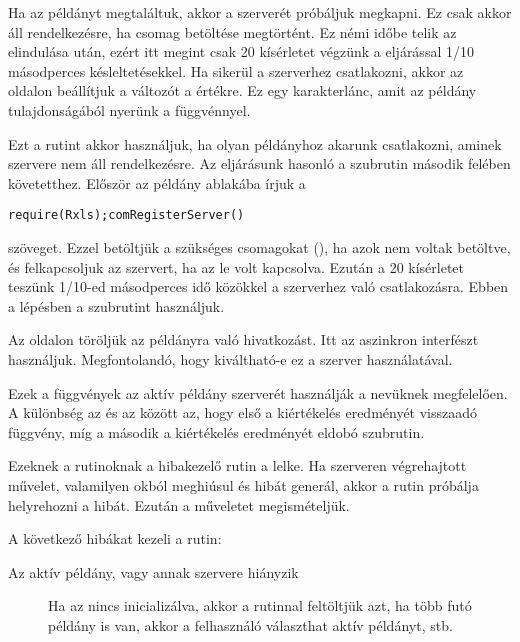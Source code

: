 \begin{description}
  Ha az 
  példányt megtaláltuk, akkor a  szerverét próbáljuk megkapni. Ez
  csak akkor áll rendelkezésre, ha  csomag betöltése megtörtént. Ez
  némi időbe telik az   elindulása után, ezért itt megint csak 20
  kísérletet végzünk a  eljárással 1/10 másodperces
  késleltetésekkel. Ha sikerül a  szerverhez csatlakozni, akkor az
   oldalon beállítjuk a  változót a
   értékre. Ez 
  egy karakterlánc, amit az  példány  tulajdonságából
  nyerünk a  függvénnyel.  
\item[\code{loadCOM}] Ezt a rutint akkor
  használjuk, ha olyan  példányhoz akarunk csatlakozni, aminek 
  szervere nem áll rendelkezésre. Az eljárásunk hasonló a 
  szubrutin második felében követetthez. Először az  példány
  ablakába írjuk a  
\begin{verbatim}
require(Rxls);comRegisterServer()
\end{verbatim}
  szöveget. Ezzel
  betöltjük a szükséges csomagokat (), ha azok nem
  voltak betöltve, és felkapcsoljuk az  szervert, ha az le volt
  kapcsolva. Ezután a 20 kísérletet teszünk 1/10-ed másodperces idő
  közökkel a  szerverhez való csatlakozásra.   Ebben a lépésben a 
   szubrutint használjuk.  
\item[\code{Rclose}] Az  oldalon töröljük
  az  példányra való hivatkozást. Itt az aszinkron interfészt
  használjuk. Megfontolandó, hogy kiváltható-e ez a  szerver
  használatával.  
\item[\code{Rgetsymbol}, \code{Rsetsymbol}, \code{Reval}, \code{REvalSync}, \code{correct}]
  Ezek a függvények az aktív  példány  szerverét használják a
  nevüknek megfelelően. A különbség az  és az
    között 
  az, hogy első a kiértékelés eredményét visszaadó függvény, míg a
  második a kiértékelés eredményét eldobó szubrutin. 

  Ezeknek a
  rutinoknak a  hibakezelő rutin a lelke. Ha  szerveren
  végrehajtott  művelet, valamilyen okból meghiúsul és hibát generál,
  akkor a  rutin próbálja  helyrehozni a hibát. Ezután a
  műveletet megismételjük.  

  A következő hibákat kezeli a rutin:
  \begin{description}
  \item[{Az aktív  példány, vagy annak  szervere
      hiányzik}] Ha az 
      nincs inicializálva, akkor a
    rutinnal feltöltjük azt, ha több futó  példány is van, akkor a
    felhasználó választhat aktív  példányt, stb.  
    

\end{description}
\end{description}
